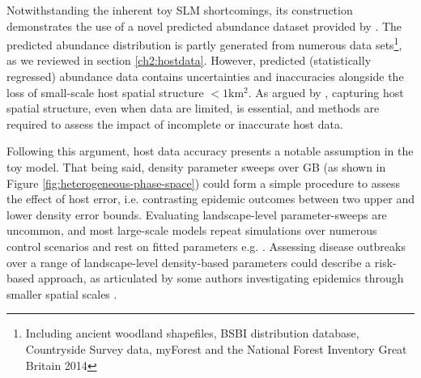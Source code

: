 Notwithstanding the inherent toy SLM shortcomings, its construction demonstrates the use of a novel predicted abundance
dataset provided by \cite{hill.data}.
The predicted abundance distribution is partly generated from numerous data sets\footnote{
Including ancient woodland shapefiles, BSBI distribution database, Countryside Survey data, myForest and the National Forest Inventory Great Britain 2014},
as we reviewed in section \ref{ch2:hostdata}.
However, predicted (statistically regressed) abundance data contains uncertainties and 
inaccuracies alongside the loss of small-scale host spatial structure $<1\mathrm{km^2}$.
As argued by \cite{13-challenges}, capturing host spatial structure, even when data are limited, 
is essential, and methods are required to assess the impact of incomplete or inaccurate host data.

Following this argument, host data accuracy presents a notable assumption in the toy model.
That being said, density parameter sweeps over GB (as shown in Figure \ref{fig:heterogeneous-phase-space}) could 
form a simple procedure to assess the effect of host error, i.e. contrasting epidemic outcomes between two upper
and lower density error bounds. Evaluating landscape-level parameter-sweeps are uncommon, 
and most large-scale models repeat simulations over numerous control scenarios and rest on 
fitted parameters e.g. \cite{large-scale-control, doi:10.1111/j.1365-3059.2010.02391.x}.
Assessing disease outbreaks over a range of landscape-level density-based parameters could describe a risk-based approach,
as articulated by some authors investigating epidemics through smaller spatial scales \cite{risk-potential-control}.

\newpage